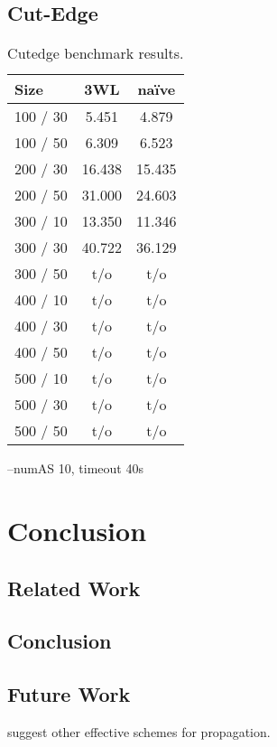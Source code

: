 \documentclass{vutinfth} %
\begin{document}
\section{Cut-Edge}

\begin{table}
\begin{center}
	\begin{tabular}{|l|c|c|}
\hline
Size & 3WL & na\"{i}ve \\
\hline 
100 / 30 & 5.451 & 4.879\\
100 / 50 & 6.309 & 6.523\\
200 / 30 & 16.438 & 15.435\\
200 / 50 & 31.000 & 24.603\\
300 / 10 & 13.350 & 11.346\\
300 / 30 & 40.722 & 36.129 \\
300 / 50 & t/o & t/o \\
400 / 10 & t/o & t/o \\
400 / 30 & t/o & t/o \\
400 / 50 & t/o & t/o \\
500 / 10 & t/o & t/o \\
500 / 30 & t/o & t/o \\
500 / 50 & t/o & t/o \\
\hline
	\end{tabular}
	\end{center}
	\caption{Cutedge benchmark results.}
\end{table}

--numAS 10, timeout 40s

\chapter{Conclusion}

\section{Related Work}

\section{Conclusion}

\section{Future Work}

\cite{effstructs} suggest other effective schemes for propagation.
\end{document}
